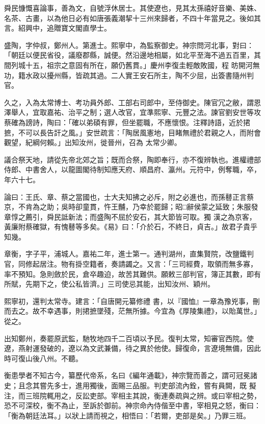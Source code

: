\begin{pinyinscope}
 舜民慷慨喜論事，善為文，自號浮休居士。其使遼也，見其太孫禧好音樂、美姝、名茶、古畫，以為他日必有如唐張義潮挈十三州來歸者，不四十年當見之。後如其言。紹興中，追贈寶文閣直學士。



 盛陶，字仲叔，鄭州人。第進士。熙寧中，為監察御史。神宗問河北事，對曰：「朝廷以便民省役，議廢郡縣，誠便。然沿邊地相屬，如北平至海不過五百里，其間列城十五，祖宗之意固有所在，願仍舊貫。」慶州李復圭輕敵敗國，程
 昉開河無功，籍水政以擾州縣，皆疏其過。二人實王安石所主，陶不少屈，出簽書隨州判官。



 久之，入為太常博士、考功員外郎、工部右司郎中，至侍御史。陳官冗之敝，謂恩澤舉人，宜取嘉祐、治平之制；選人改官，宜準熙寧、元豐之法。諫官劉安世等攻蔡確為謗詩，陶曰：「確以弟碩有罪，但坐罷職，不應懷恨。注釋詩語，近於捃摭，不可以長告訐之風。」安世疏言：「陶居風憲地，目睹無禮於君親之人，而附會觀望，紀綱何賴。」出知汝州，徙晉州，召為
 太常少卿。



 議合祭天地，請從先帝北郊之旨；既而合祭，陶即奉行，亦不復辨執也。進權禮部侍郎、中書舍人，以龍圖閣待制知應天府、順昌府、瀛州。元符中，例奪職，卒，年六十七。



 論曰：王氏、章、蔡之當國也，士大夫知拂之必斥，附之必進也，而孫鼛正言蔡京，不肯為之助；吳時卻童貫，忤王黼，乃幸於罷歸；昭□辭侯蒙之延致；朱服發章惇之薦引，舜民詆新法；而盛陶不屈於安石，其大節皆可取。獨
 漢之為京客，黃廉附蔡確獄，有愧鼛等多矣。《易》曰：「介於石，不終日，貞吉。」故君子貴乎知幾。



 章衡，字子平，浦城人。嘉祐二年，進士第一。通判湖州，直集賢院，改鹽鐵判官，同修起居注。物有掛空籍者，奏請蠲之。又言：「三司經費，取領而無多寡，率不預知。急則斂於民，倉卒趣迫，故苦其難供。願敕三部判官，簿正其數，即有所賦，先期下之，使公私皆濟。」三司使忌其能，出知汝州、穎州。



 熙寧初，還判太常寺。建言：「自唐開元纂修禮
 書，以『國恤』一章為豫兇事，刪而去之。故不幸遇事，則捃摭墜殘，茫無所據。今宜為《厚陵集禮》，以貽萬世。」從之。



 出知鄭州，奏罷原武監，馳牧地四千二百頃以予民。復判太常，知審官西院。使遼，燕射運發破的，遼以為文武兼備，待之異於他使。歸復命，言遼境無備，因此時可復山後八州。不聽。



 衡患學者不知古今，纂歷代帝系，名曰《編年通載》，神宗覽而善之，謂可冠冕諸史；且念其嘗先多士，進用獨後，面賜三品服。判吏部流內銓，嘗有員闕，既
 擬注，而三班院輒用之，反訟吏部。宰相主其說，衡連奏疏與之辨。或曰宰相之勢，恐不可深校，衡不為止，至訴於御前。神宗命內侍偕至中書，宰相見之怒，衡曰：「衡為朝廷法耳。」以狀上請而視之，相悟曰：「若爾，吏部是矣。」乃罪三班。




\end{pinyinscope}
